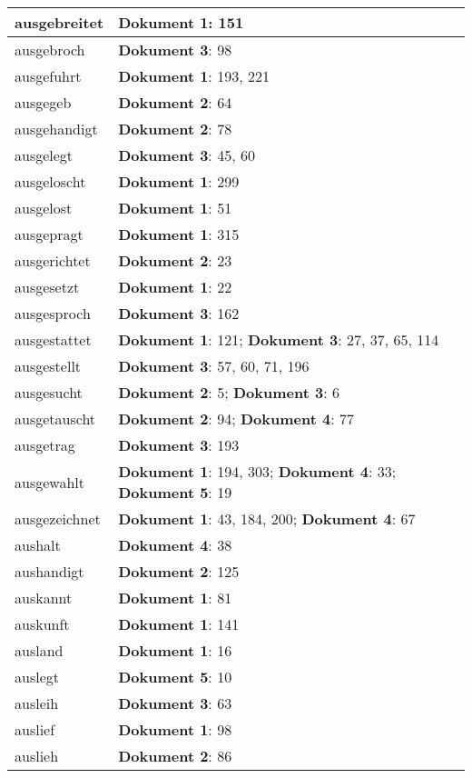 \documentclass[a5paper]{article}
\begin{document}
\begin{longtable}[l]{|l|p{3in}|}
ausgebreitet & \textbf{Dokument 1}: 151 \\
\hline
ausgebroch & \textbf{Dokument 3}: 98 \\
\hline
ausgefuhrt & \textbf{Dokument 1}: 193, 221 \\
\hline
ausgegeb & \textbf{Dokument 2}: 64 \\
\hline
ausgehandigt & \textbf{Dokument 2}: 78 \\
\hline
ausgelegt & \textbf{Dokument 3}: 45, 60 \\
\hline
ausgeloscht & \textbf{Dokument 1}: 299 \\
\hline
ausgelost & \textbf{Dokument 1}: 51 \\
\hline
ausgepragt & \textbf{Dokument 1}: 315 \\
\hline
ausgerichtet & \textbf{Dokument 2}: 23 \\
\hline
ausgesetzt & \textbf{Dokument 1}: 22 \\
\hline
ausgesproch & \textbf{Dokument 3}: 162 \\
\hline
ausgestattet & \textbf{Dokument 1}: 121; \textbf{Dokument 3}: 27, 37, 65, 114 \\
\hline
ausgestellt & \textbf{Dokument 3}: 57, 60, 71, 196 \\
\hline
ausgesucht & \textbf{Dokument 2}: 5; \textbf{Dokument 3}: 6 \\
\hline
ausgetauscht & \textbf{Dokument 2}: 94; \textbf{Dokument 4}: 77 \\
\hline
ausgetrag & \textbf{Dokument 3}: 193 \\
\hline
ausgewahlt & \textbf{Dokument 1}: 194, 303; \textbf{Dokument 4}: 33; \textbf{Dokument 5}: 19 \\
\hline
ausgezeichnet & \textbf{Dokument 1}: 43, 184, 200; \textbf{Dokument 4}: 67 \\
\hline
aushalt & \textbf{Dokument 4}: 38 \\
\hline
aushandigt & \textbf{Dokument 2}: 125 \\
\hline
auskannt & \textbf{Dokument 1}: 81 \\
\hline
auskunft & \textbf{Dokument 1}: 141 \\
\hline
ausland & \textbf{Dokument 1}: 16 \\
\hline
auslegt & \textbf{Dokument 5}: 10 \\
\hline
ausleih & \textbf{Dokument 3}: 63 \\
\hline
auslief & \textbf{Dokument 1}: 98 \\
\hline
auslieh & \textbf{Dokument 2}: 86 \\

\end{longtable}
\end{document}
